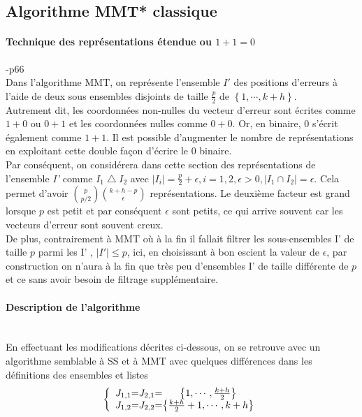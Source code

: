 \documentclass[12pt,openany]{report}
\begin{document}
\subsection{Algorithme MMT* classique}
\paragraph{Technique des représentations étendue ou $1+1=0$ }\cite{Ghazal}-p66 \\

Dans l’algorithme MMT, on représente l’ensemble $\mathit{I'}$ des positions d’erreurs à l’aide de deux sous ensembles disjoints de taille $ \frac{p}{2} $
de $\left\lbrace 1,\cdots, k+h\right\rbrace $. 
 \\Autrement dit, les coordonnées
non-nulles du vecteur d’erreur sont écrites comme $1+0$ ou $0+1$ et les coordonnées
nulles comme $0+0$. Or, en binaire, 0 s’écrit également comme $1+1$. Il est possible
d’augmenter le nombre de représentations en exploitant cette double façon
d’écrire le 0 binaire.\\

Par conséquent, on considérera dans cette section des représentations de l'ensemble \textit{I'} comme $I_1\bigtriangleup I_2  $ avec $\mid I_i \mid =\frac{p}{2}+\epsilon , i=1,2,\epsilon >0 , \mid I_1 \cap I_2\mid=\epsilon $. Cela permet d'avoir $ { {p\choose p/2} {{k+h-p}\choose \epsilon}}   $ représentations. Le deuxième facteur est grand lorsque $p$ est petit
et par conséquent $\epsilon $ sont petits, ce qui arrive souvent car les vecteurs d’erreur
sont souvent creux.\\
De plus, contrairement à MMT où à la fin il fallait filtrer les sous-ensembles
I' de taille $p$ parmi les I'
, $\mid I'
\mid \leq p$, ici, en choisissant à bon escient la valeur
de $\epsilon $, par construction on n’aura à la fin que très peu d’ensembles I' de taille
différente de $p$ et ce sans avoir besoin de filtrage supplémentaire.\\

\paragraph{Description de l'algorithme }\cite{Ghazal}\\ En effectuant les modifications décrites ci-dessous, on se retrouve avec un algorithme semblable à SS et à MMT avec quelques différences dans les définitions des ensembles et listes
\[
\left\lbrace 
\begin{array}{c @{=}c @{=} c}
J_{1,1}&J_{2,1}&\left\lbrace 1,\cdots,\frac{k+h}{2} \right\rbrace\\
J_{1,2}&J_{2,2}&\left\lbrace \frac{k+h}{2}+1,\cdots ,k+h \right\rbrace  
\end{array}
\right.
\]
\end{document}
